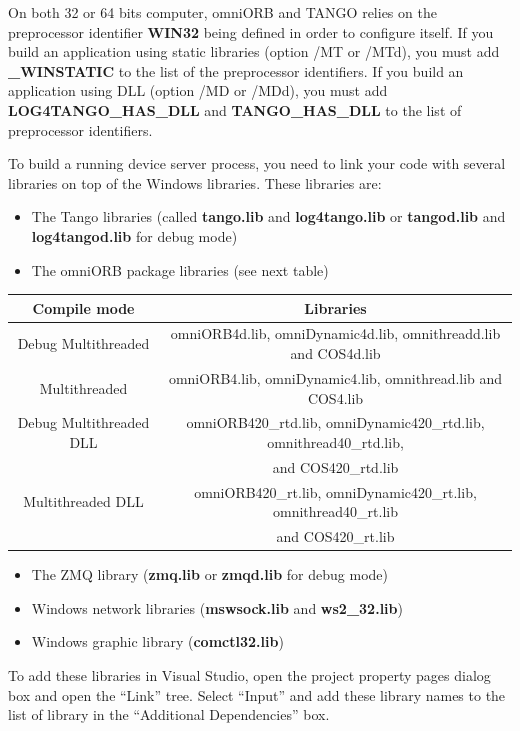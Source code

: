 On both 32 or 64 bits computer, omniORB and TANGO relies on the preprocessor
identifier \textbf{WIN32} being defined in order to
configure itself. If you build an application using static libraries
(option /MT or /MTd), you must add \textbf{\_WINSTATIC} to the list
of the preprocessor identifiers. If you build an application using
DLL (option /MD or /MDd), you must add \textbf{LOG4TANGO\_HAS\_DLL}
and \textbf{TANGO\_HAS\_DLL} to the list of preprocessor identifiers.

To build a running device server process, you need to link your code
with several libraries on top of the Windows libraries. These libraries
are:
\begin{itemize}
\item The Tango libraries (called \textbf{tango.lib} and \textbf{log4tango.lib}
or \textbf{tangod.lib} and \textbf{log4tangod.lib} for debug mode)
\item The omniORB package libraries (see next table)\\
\end{itemize}
\begin{center}
\begin{longtable}{|c|c|}
\hline 
Compile mode & Libraries\tabularnewline
\hline 
\hline 
Debug Multithreaded & omniORB4d.lib, omniDynamic4d.lib, omnithreadd.lib and COS4d.lib\tabularnewline
\hline 
Multithreaded & omniORB4.lib, omniDynamic4.lib, omnithread.lib and COS4.lib\tabularnewline
\hline 
Debug Multithreaded DLL & omniORB420\_rtd.lib, omniDynamic420\_rtd.lib, omnithread40\_rtd.lib,\tabularnewline
 & and COS420\_rtd.lib\tabularnewline
\hline 
Multithreaded DLL & omniORB420\_rt.lib, omniDynamic420\_rt.lib, omnithread40\_rt.lib\tabularnewline
 & and COS420\_rt.lib\tabularnewline
\hline 
\end{longtable}
\par\end{center}
\begin{itemize}
\item The ZMQ library (\textbf{zmq.lib} or \textbf{zmqd.lib} for debug mode)
\item Windows network libraries (\textbf{mswsock.lib} and \textbf{ws2\_32.lib})
\item Windows graphic library (\textbf{comctl32.lib})
\end{itemize}
To add these libraries in Visual Studio, open the project property
pages dialog box and open the ``Link'' tree. Select ``Input''
and add these library names to the list of library in the ``Additional
Dependencies'' box. 

